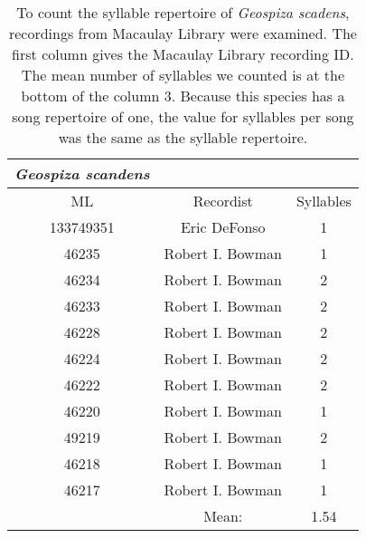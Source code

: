 \documentclass[a4paper,12pt]{article}
\begin{document}
\begin{table}[ht]
\caption{To count the syllable repertoire of \textit{Geospiza scadens}, recordings from Macaulay Library were examined. The first column gives the Macaulay Library recording ID. The mean number of syllables we counted is at the bottom of the column 3. Because this species has a song repertoire of one, the value for syllables per song was the same as the syllable repertoire.}
\centering
\begin{tabular}{ccc}
  \hline
\textit{Geospiza scandens} &  &  \\ 
  \hline \hline
ML & Recordist & Syllables \\ \hline
  133749351 & Eric DeFonso  & 1 \\ 
  46235 & Robert I. Bowman & 1 \\ 
  46234 & Robert I. Bowman & 2 \\ 
  46233 & Robert I. Bowman & 2 \\ 
  46228 & Robert I. Bowman & 2 \\ 
  46224 & Robert I. Bowman & 2 \\ 
  46222 & Robert I. Bowman & 2 \\ 
  46220 & Robert I. Bowman & 1 \\ 
  49219 & Robert I. Bowman & 2 \\ 
  46218 & Robert I. Bowman & 1 \\ 
  46217 & Robert I. Bowman & 1 \\ \hline
   & Mean: & 1.54 \\ 
   \hline
\end{tabular}
\end{table}
\end{document}
